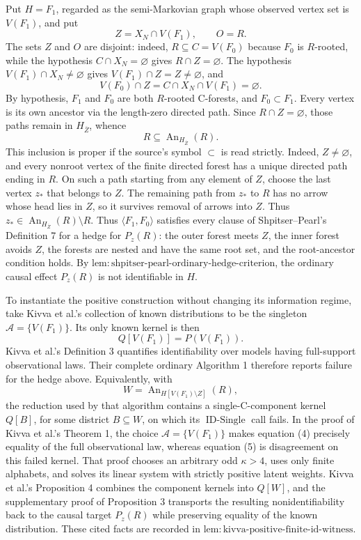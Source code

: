 Put \(H=F_1\), regarded as the semi-Markovian graph whose observed vertex set is \(V(F_1)\), and put
\[
 Z=X_N\cap V(F_1),\qquad O=R.
\]
The sets \(Z\) and \(O\) are disjoint: indeed, \(R\subseteq C=V(F_0)\) because \(F_0\) is \(R\)-rooted, while the hypothesis \(C\cap X_N=\varnothing\) gives \(R\cap Z=\varnothing\). The hypothesis \(V(F_1)\cap X_N\ne\varnothing\) gives \(V(F_1)\cap Z=Z\ne\varnothing\), and
\[
 V(F_0)\cap Z=C\cap X_N\cap V(F_1)=\varnothing.
\]
By hypothesis, \(F_1\) and \(F_0\) are both \(R\)-rooted C-forests, and \(F_0\subset F_1\). Every vertex is its own ancestor via the length-zero directed path. Since \(R\cap Z=\varnothing\), those paths remain in \(H_{\overline Z}\), whence
\[
 R\subseteq\operatorname{An}_{H_{\overline Z}}(R).
\]
This inclusion is proper if the source's symbol \(\subset\) is read strictly. Indeed, \(Z\ne\varnothing\), and every nonroot vertex of the finite directed forest has a unique directed path ending in \(R\). On such a path starting from any element of \(Z\), choose the last vertex \(z_*\) that belongs to \(Z\). The remaining path from \(z_*\) to \(R\) has no arrow whose head lies in \(Z\), so it survives removal of arrows into \(Z\). Thus \(z_*\in\operatorname{An}_{H_{\overline Z}}(R)\setminus R\).
Thus \(\langle F_1,F_0\rangle\) satisfies every clause of Shpitser--Pearl's Definition 7 for a hedge for \(P_z(R)\): the outer forest meets \(Z\), the inner forest avoids \(Z\), the forests are nested and have the same root set, and the root-ancestor condition holds. By \(\mathrm{lem:shpitser\text{-}pearl\text{-}ordinary\text{-}hedge\text{-}criterion}\), the ordinary causal effect \(P_z(R)\) is not identifiable in \(H\).

To instantiate the positive construction without changing its information regime, take Kivva et al.'s collection of known distributions to be the singleton \(\mathcal A=\{V(F_1)\}\). Its only known kernel is then
\[
 Q[V(F_1)]=P(V(F_1)).
\]
Kivva et al.'s Definition 3 quantifies identifiability over models having full-support observational laws. Their complete ordinary Algorithm 1 therefore reports failure for the hedge above. Equivalently, with
\[
 W=\operatorname{An}_{H[V(F_1)\setminus Z]}(R),
\]
the reduction used by that algorithm contains a single-C-component kernel \(Q[B]\), for some district \(B\subseteq W\), on which its \(\operatorname{ID\text{-}Single}\) call fails. In the proof of Kivva et al.'s Theorem 1, the choice \(\mathcal A=\{V(F_1)\}\) makes equation (4) precisely equality of the full observational law, whereas equation (5) is disagreement on this failed kernel. That proof chooses an arbitrary odd \(\kappa>4\), uses only finite alphabets, and solves its linear system with strictly positive latent weights. Kivva et al.'s Proposition 4 combines the component kernels into \(Q[W]\), and the supplementary proof of Proposition 3 transports the resulting nonidentifiability back to the causal target \(P_z(R)\) while preserving equality of the known distribution. These cited facts are recorded in \(\mathrm{lem:kivva\text{-}positive\text{-}finite\text{-}id\text{-}witness}\).

